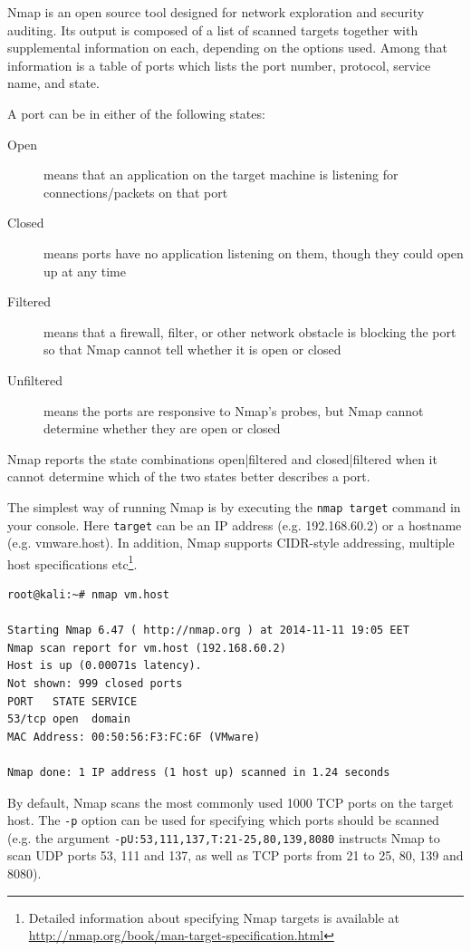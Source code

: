 \documentclass[a4paper,oneside,12pt]{book}
\begin{document}
Nmap is an open source tool designed for network exploration and security auditing. Its output is composed of a list of scanned targets together with supplemental information on each, depending on the options used. Among that information is a table of ports which lists the port number, protocol, service name, and state. 

A port can be in either of the following states:
\begin{description}
\item[Open] means that an application on the target machine is listening for connections/packets on that port
\item[Closed] means ports have no application listening on them, though they could open up at any time
\item[Filtered] means that a firewall, filter, or other network obstacle is blocking the port so that Nmap cannot tell whether it is open or closed
\item[Unfiltered] means the ports are responsive to Nmap's probes, but Nmap cannot determine whether they are open or closed
\end{description}

Nmap reports the state combinations open|filtered and closed|filtered when it cannot determine which of the two states better describes a port.

The simplest way of running Nmap is by executing the \texttt{nmap target} command in your console. Here \texttt{target} can be an IP address (e.g. 192.168.60.2) or a hostname (e.g. vmware.host). In addition, Nmap supports CIDR-style addressing, multiple host specifications etc\footnote{Detailed information about specifying Nmap targets is available at \url{http://nmap.org/book/man-target-specification.html}}.

\begin{lstlisting}[title=A sample Nmap scan with no options]
root@kali:~# nmap vm.host

Starting Nmap 6.47 ( http://nmap.org ) at 2014-11-11 19:05 EET
Nmap scan report for vm.host (192.168.60.2)
Host is up (0.00071s latency).
Not shown: 999 closed ports
PORT   STATE SERVICE
53/tcp open  domain
MAC Address: 00:50:56:F3:FC:6F (VMware)

Nmap done: 1 IP address (1 host up) scanned in 1.24 seconds
\end{lstlisting}

By default, Nmap scans the most commonly used 1000 TCP ports on the target host. The \texttt{-p} option can be used for specifying which ports should be scanned (e.g. the argument \texttt{-pU:53,111,137,T:21-25,80,139,8080} instructs Nmap to scan UDP ports 53, 111 and 137, as well as TCP ports from 21 to 25, 80, 139 and 8080).
\end{document}
